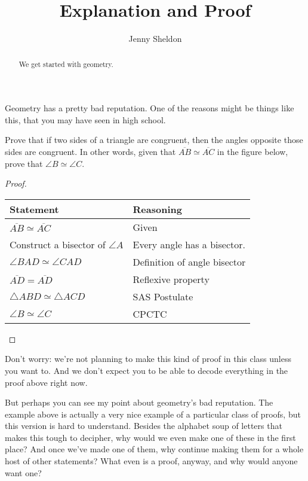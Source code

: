 \documentclass{ximera}
\title{Explanation and Proof}
\author{Jenny Sheldon}
\begin{document}
\begin{abstract}
We get started with geometry.
\end{abstract}
\maketitle

Geometry has a pretty bad reputation. One of the reasons might be things like this, that you may have seen in high school.

\begin{theorem}
	Prove that if two sides of a triangle are congruent, then the angles opposite those sides are congruent. In other words, given that $\overline{AB} \simeq \overline{AC}$ in the figure below, prove that $\angle B \simeq \angle C$.
	\begin{image}
	\end{image}
\end{theorem}

\begin{proof}

\begin{tabular}{l|l} \hline
{\bf Statement} & {\bf Reasoning} \\ \hline
$\overline{AB} \simeq \overline{AC}$ & Given \\ \hline
Construct a bisector of $\angle A$ & Every angle has a bisector. \\ \hline
$\angle BAD \simeq \angle CAD$ & Definition of angle bisector \\ \hline
$\overline{AD} = \overline{AD}$ & Reflexive property \\ \hline
$\triangle ABD \simeq \triangle ACD$ & SAS Postulate \\ \hline
$\angle B \simeq \angle C$ & CPCTC \\ \hline
\end{tabular}
\end{proof}

Don't worry: we're not planning to make this kind of proof in this class unless you want to. And we don't expect you to be able to decode everything in the proof above right now. 

But perhaps you can see my point about geometry's bad reputation. The example above is actually a very nice example of a particular class of proofs, but this version is hard to understand.  Besides the alphabet soup of letters that makes this tough to decipher, why would we even make one of these in the first place? And once we've made one of them, why continue making them for a whole host of other statements? What even is a proof, anyway, and why would anyone want one? 
\end{document}
